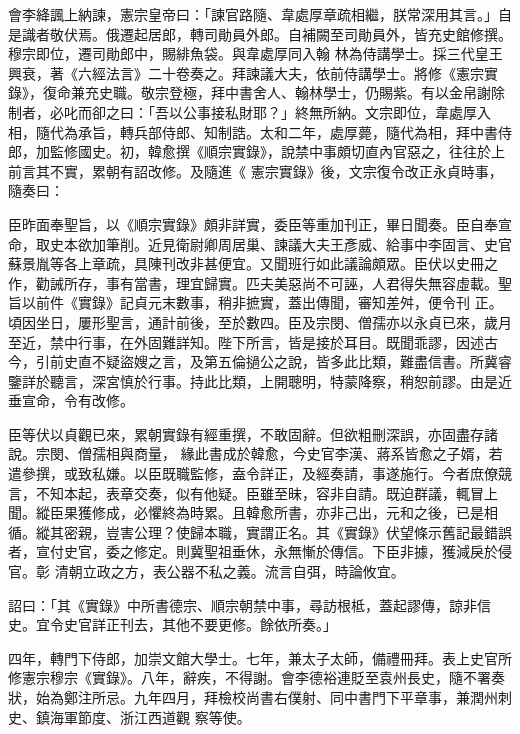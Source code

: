\begin{pinyinscope}
 會李絳諷上納諫，憲宗皇帝曰：「諫官路隨、韋處厚章疏相繼，朕常深用其言。」自是識者敬伏焉。俄遷起居郎，轉司勛員外郎。自補闕至司勛員外，皆充史館修撰。穆宗即位，遷司勛郎中，賜緋魚袋。與韋處厚同入翰
 林為侍講學士。採三代皇王興衰，著《六經法言》二十卷奏之。拜諫議大夫，依前侍講學士。將修《憲宗實錄》，復命兼充史職。敬宗登極，拜中書舍人、翰林學士，仍賜紫。有以金帛謝除制者，必叱而卻之曰：「吾以公事接私財耶？」終無所納。文宗即位，韋處厚入相，隨代為承旨，轉兵部侍郎、知制誥。太和二年，處厚薨，隨代為相，拜中書侍郎，加監修國史。初，韓愈撰《順宗實錄》，說禁中事頗切直內官惡之，往往於上前言其不實，累朝有詔改修。及隨進《
 憲宗實錄》後，文宗復令改正永貞時事，隨奏曰：



 臣昨面奉聖旨，以《順宗實錄》頗非詳實，委臣等重加刊正，畢日聞奏。臣自奉宣命，取史本欲加筆削。近見衛尉卿周居巢、諫議大夫王彥威、給事中李固言、史官蘇景胤等各上章疏，具陳刊改非甚便宜。又聞班行如此議論頗眾。臣伏以史冊之作，勸誡所存，事有當書，理宜歸實。匹夫美惡尚不可誣，人君得失無容虛載。聖旨以前件《實錄》記貞元末數事，稍非摭實，蓋出傳聞，審知差舛，便令刊
 正。頃因坐日，屢形聖言，通計前後，至於數四。臣及宗閔、僧孺亦以永貞已來，歲月至近，禁中行事，在外固難詳知。陛下所言，皆是接於耳目。既聞乖謬，因述古今，引前史直不疑盜嫂之言，及第五倫撾公之說，皆多此比類，難盡信書。所冀睿鑒詳於聽言，深宮慎於行事。持此比類，上開聰明，特蒙降察，稍恕前謬。由是近垂宣命，令有改修。



 臣等伏以貞觀已來，累朝實錄有經重撰，不敢固辭。但欲粗刪深誤，亦固盡存諸說。宗閔、僧孺相與商量，
 緣此書成於韓愈，今史官李漢、蔣系皆愈之子婿，若遣參撰，或致私嫌。以臣既職監修，盍令詳正，及經奏請，事遂施行。今者庶僚競言，不知本起，表章交奏，似有他疑。臣雖至昧，容非自請。既迫群議，輒冒上聞。縱臣果獲修成，必懼終為時累。且韓愈所書，亦非己出，元和之後，已是相循。縱其密親，豈害公理？使歸本職，實謂正名。其《實錄》伏望條示舊記最錯誤者，宣付史官，委之修定。則冀聖祖垂休，永無慚於傳信。下臣非據，獲減戾於侵官。彰
 清朝立政之方，表公器不私之義。流言自弭，時論攸宜。



 詔曰：「其《實錄》中所書德宗、順宗朝禁中事，尋訪根柢，蓋起謬傳，諒非信史。宜令史官詳正刊去，其他不要更修。餘依所奏。」



 四年，轉門下侍郎，加崇文館大學士。七年，兼太子太師，備禮冊拜。表上史官所修憲宗穆宗《實錄》。八年，辭疾，不得謝。會李德裕連貶至袁州長史，隨不署奏狀，始為鄭注所忌。九年四月，拜檢校尚書右僕射、同中書門下平章事，兼潤州刺史、鎮海軍節度、浙江西道觀
 察等使。




\end{pinyinscope}
